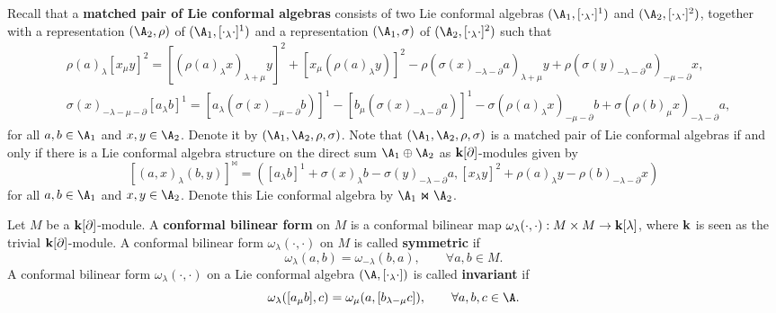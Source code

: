 \documentclass[12pt]{amsart}
\begin{document}
    Recall \cite{HL1} that a {\bf matched pair of Lie conformal algebras}  consists of two  Lie conformal algebras $(\A_1,[\cdot_\lambda \cdot]^1)$ and $(\A_2,[\cdot_\lambda \cdot]^2)$,  together with a representation $(\A_2, \rho)$ of $(\A_1,[\cdot_\lambda \cdot]^1)$ and a representation $(\A_1, \sigma)$ of $(\A_2,[\cdot_\lambda \cdot]^2)$ such that
    \begin{align*}
        &\rho(a)_\lambda[x_\mu y]^2=[(\rho(a)_\lambda x)_{\lambda+\mu }y]^2+[x_\mu(\rho(a)_\lambda y)]^2-\rho(\sigma(x)_{-\lambda-\partial }a)_{\lambda+\mu}y+\rho(\sigma(y)_{-\lambda-\partial}a)_{-\mu-\partial}x,\\
        &\sigma(x)_{-\lambda-\mu-\partial}[a_\lambda b]^1=[a_\lambda(\sigma(x)_{-\mu-\partial}b)]^1-[b_\mu(\sigma(x)_{-\lambda-\partial} a)]^1-\sigma(\rho(a)_{\lambda }x)_{-\mu-\partial}b+\sigma(\rho(b)_{\mu}x)_{-\lambda-\partial}a,
    \end{align*}
    for all $a,b\in \A_1$ and $x,y\in \A_2$. Denote it by $(\A_1,\A_2, \rho,\sigma)$. Note that $(\A_1,\A_2, \rho,\sigma)$ is a matched pair of Lie conformal algebras if and only if there is a Lie conformal algebra structure on the direct sum $\A_1\oplus \A_2$ as ${\bf k}[\partial]$-modules given by
    \begin{equation}\label{mplb}
        [(a,x)_\lambda (b,y)]^\Join=([a_\lambda b]^1+\sigma(x)_\lambda b-\sigma(y)_{-\lambda-\partial}a,[x_\lambda y]^2+\rho(a)_\lambda y-\rho(b)_{-\lambda-\partial}x)
    \end{equation}
    for all $a,b\in \A_1$ and $x,y\in \A_2$. Denote this Lie conformal algebra by $\A_1\Join \A_2$.

    \begin{definition}\cite{BKL}
        Let $M$ be a ${\bf k}[\partial]$-module. A {\bf conformal bilinear form} on $M$  is a conformal bilinear map $\omega_\lambda(\cdot,\cdot):M\times M\rightarrow {\bf k}[\lambda]$, where ${\bf k}$ is seen as the trivial ${\bf k}[\partial]$-module. A conformal bilinear form $\omega_\lambda(\cdot,\cdot)$  on $M$ is called {\bf symmetric } if
        \begin{equation*}
            \omega_\lambda(a,b)=\omega_{-\lambda}(b,a),\qquad  \forall  a,b\in M.
        \end{equation*}
        A conformal bilinear form $\omega_\lambda(\cdot,\cdot)$ on a Lie conformal algebra $(\A,[\cdot_\lambda\cdot])$ is called {\bf invariant} if
        \begin{equation}\label{cbf1}
            \omega_\lambda([a_\mu b],c)=\omega_{\mu}(a,[b_{\lambda-\mu}c]),\qquad \forall a,b,c\in \A.
        \end{equation}
    \end{definition}
\end{document}
